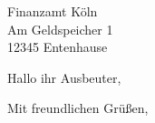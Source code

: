 \documentclass[12pt,ngerman]{scrlttr2}
\begin{document}
\begin{letter}{Finanzamt Köln \\ Am Geldspeicher 1 \\ 12345 Entenhause}
\opening{Hallo ihr Ausbeuter,}
	
\blindtext[3]
	
\closing{Mit freundlichen Grüßen,}	
\end{letter}



	
\end{document}

